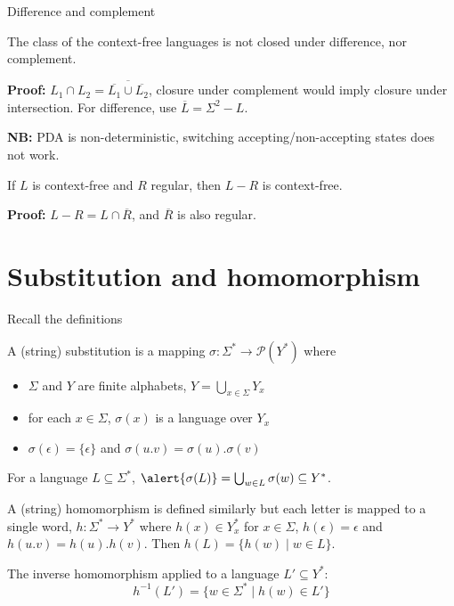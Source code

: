\documentclass[handout]{beamer}
\begin{document}
\begin{frame}{Difference and complement}

    \begin{theorem}
        The class of the context-free languages is not closed under difference, nor complement.
    \end{theorem}

    \textbf{Proof:} $L_1\cap L_2=\overline{\overline{L_1}\cup\overline{L_2}}$, closure under complement would imply closure under intersection. For difference, use $\overline{L}=\Sigma^2-L$.\hfill\qedsymbol

    \textbf{NB:} PDA is non-deterministic, switching accepting/non-accepting states does not work.

    \medskip

    \begin{proposition}
        If $L$ is context-free and $R$ regular, then $L-R$ is context-free.
    \end{proposition}

    \textbf{Proof:} $L-R=L\cap\overline{R}$, and $\overline{R}$ is also regular.\hfill\qedsymbol 

\end{frame}


\section*{Substitution and homomorphism}


\begin{frame}{Recall the definitions}
   
    A (string) \alert{substitution} is a mapping $\sigma\colon \Sigma^*\rightarrow \mathcal P(Y^*)$ where
    \begin{itemize}
        \item $\Sigma$ and $Y$ are finite alphabets, $Y=\bigcup_{x\in \Sigma}Y_x$
        \item for each $x\in \Sigma$, $\sigma(x)$ is a language over $Y_x$
        \item $\sigma(\epsilon)=\{\epsilon\}$ and $\sigma(u.v)=\sigma(u).\sigma(v)$
    \end{itemize}
    For a language $L\subseteq \Sigma^*$, $\alert{\sigma(L)}=\bigcup_{w\in L}\sigma(w)\subseteq Y^*$. %

    A (string) \alert{homomorphism} is defined similarly but each letter is mapped to a single word, $h\colon\Sigma^*\rightarrow Y^*$ where $h(x)\in Y_x^*$ for $x\in\Sigma$, $h(\epsilon)=\epsilon$ and $h(u.v)=h(u).h(v)$. Then \alert{$h(L)=\{h(w)\mid w\in L\}$}. %

    The \alert{inverse homomorphism} applied to a language $L'\subseteq Y^*$: 
    $$
    h^{-1}(L')=\{w\in\Sigma^*\mid h(w)\in L'\}
    $$

\end{frame}
\end{document}
